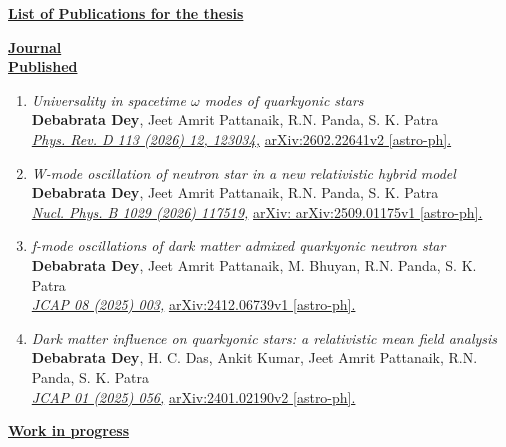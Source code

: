 \begin{center}
\textbf{\large \underline{List of Publications for the thesis}}
\end{center}
\textbf{\large \underline{{Journal}}}\\
\textbf{\underline{Published}}
\begin{enumerate}
\item \textit{Universality in spacetime $\omega$
	modes of quarkyonic stars} \\
\textbf{Debabrata Dey}, Jeet Amrit Pattanaik, R.N. Panda, S. K. Patra\\
\href{https://journals.aps.org/prd/abstract/10.1103/xs28-lt42}{\textit{Phys. Rev. D 113 (2026) 12, 123034,}} \href{https://arxiv.org/pdf/2111.11748}{arXiv:2602.22641v2 [astro-ph].}

\item  \textit{W-mode oscillation of neutron star in a new relativistic hybrid model}\\
\textbf{Debabrata Dey}, Jeet Amrit Pattanaik, R.N. Panda, S. K. Patra\\
\href{https://www.sciencedirect.com/science/article/pii/S0550321326002269}{\textit{Nucl. Phys. B 1029 (2026) 117519,}} \href{https://arxiv.org/abs/2509.01175}{arXiv: arXiv:2509.01175v1  [astro-ph].}
\item  \textit{f-mode oscillations of dark matter admixed quarkyonic neutron star}\\
\textbf{Debabrata Dey}, Jeet Amrit Pattanaik, M. Bhuyan, R.N. Panda, S. K. Patra\\
\href{https://iopscience.iop.org/article/10.1088/1475-7516/2025/08/003}{\textit{ JCAP 08 (2025) 003,}} \href{https://arxiv.org/abs/2412.06739}{ arXiv:2412.06739v1  [astro-ph].}
\item  \textit{Dark matter influence on quarkyonic stars: a relativistic mean field analysis}\\
\textbf{Debabrata Dey}, H. C. Das, Ankit Kumar, Jeet Amrit Pattanaik, R.N. Panda, S. K. Patra\\
\href{https://iopscience.iop.org/article/10.1088/1475-7516/2025/01/056}{\textit{JCAP 01 (2025) 056,}} \href{https://arxiv.org/abs/2401.021905}{ arXiv:2401.02190v2  [astro-ph].}
\end{enumerate}
\textbf{\underline{Work in progress}}
